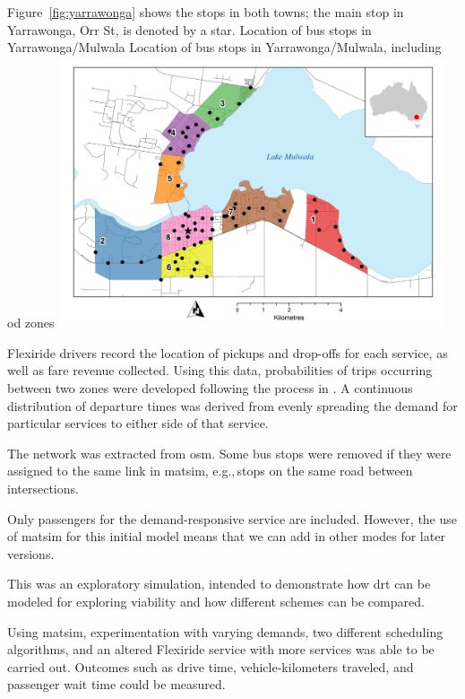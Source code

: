Figure~\ref{fig:yarrawonga} shows the stops in both towns; the main stop in Yarrawonga, Orr St, is denoted by a star.
%
\createfigure%
{Location of bus stops in Yarrawonga/Mulwala}%
{Location of bus stops in Yarrawonga/Mulwala, including \gls{od} zones}%
{\label{fig:yarrawonga}}%
{\includegraphics[width=0.85\textwidth, angle=0]{./using/figures/yarrawonga_high.png}}%
{}
%

Flexiride drivers record the location of pickups and drop-offs for each service,
as well as fare revenue collected. Using this data, probabilities of trips
occurring between two zones were developed following the process in
\citet[][]{Deflorio_ITSIET_2011}. A continuous distribution of departure times was
derived from evenly spreading the demand for particular services to either side
of that service. 


The network was extracted from \gls{osm}. Some bus stops were removed if they were assigned to the same link in \gls{matsim}, e.g.,\,stops on the same road between intersections.

Only passengers for the demand-responsive service are included. However, the use of \gls{matsim} for this initial model means that we can add in other modes for later versions.


This was an exploratory simulation, intended to demonstrate how \gls{drt} can be modeled for exploring viability and how different schemes can be compared.

Using \gls{matsim}, experimentation with varying demands, two different scheduling
algorithms, and an altered Flexiride service with more services was able to be
carried out. Outcomes such as drive time, vehicle-kilometers traveled, and
passenger wait time could be measured.

